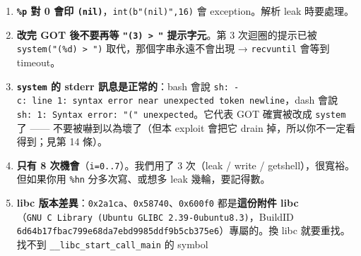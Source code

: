 \documentclass[10pt,a4paper]{article}
\begin{document}
\begin{enumerate}
  的填充、以及格式字串裡\textbf{不是格式指令}的裸文字（例如對齊用的
  \texttt{aaaaba} 貢獻 6）。所以 \texttt{\%\allowbreak{}64c\%\allowbreak{}17\$\allowbreak{}hhn} 執行到
  \texttt{\%\allowbreak{}17\$\allowbreak{}hhn} 那一刻的計數是 \textbf{64}，不是 64+7 = 75。
  想自己驗證：把位址指到一個可寫位址（或 \texttt{printf@GOT}），寫完後用
  \texttt{/\allowbreak{}proc/\allowbreak{}\textless{}\allowbreak{}pid\textgreater{}\allowbreak{}/\allowbreak{}mem} 讀回來看最低 byte
  是不是你要的值（見 §5 的自檢腳本）。 （實測：手寫
  \texttt{\%\allowbreak{}64c\%\allowbreak{}17\$\allowbreak{}hhn} 去寫一個可寫位址，結果值是 \texttt{0x40} =
  64；如果是 0x47 = 71，就代表「格式指令會計數」，但事實並非如此。）
\item
  \textbf{\texttt{\%\allowbreak{}p} 對 0 會印
  \texttt{(nil)}}，\texttt{int(b"(nil)",\allowbreak{}16)} 會 exception。解析 leak
  時要處理。
\item
  \textbf{改完 GOT 後不要再等 \texttt{"(3)\ \allowbreak{}\textgreater{}\allowbreak{}\ \allowbreak{}"}
  提示字元}。第 3 次迴圈的提示已被
  \texttt{system("(\%\allowbreak{}d)\ \allowbreak{}\textgreater{}\allowbreak{}\ \allowbreak{}")} 取代，那個字串永遠不會出現
  → \texttt{recvuntil} 會等到 timeout。
\item
  \textbf{\texttt{system} 的 stderr 訊息是正常的}：bash 會說
  \texttt{sh:\allowbreak{}\ \allowbreak{}-\allowbreak{}c:\allowbreak{}\ \allowbreak{}line\ \allowbreak{}1:\allowbreak{}\ \allowbreak{}syntax\ \allowbreak{}error\ \allowbreak{}near\ \allowbreak{}unexpected\ \allowbreak{}token\ \allowbreak{}\textquotesingle{}\allowbreak{}newline\textquotesingle{}\allowbreak{}}，dash
  會說 \texttt{sh:\allowbreak{}\ \allowbreak{}1:\allowbreak{}\ \allowbreak{}Syntax\ \allowbreak{}error:\allowbreak{}\ \allowbreak{}"("\ \allowbreak{}unexpected}。它代表 GOT
  確實被改成 \texttt{system} 了 ------ 不要被嚇到以為壞了（但本 exploit
  會把它 drain 掉，所以你不一定看得到；見第 14 條）。
\item
  \textbf{只有 8 次機會}（\texttt{i=0..\allowbreak{}7}）。我們用了 3 次（leak / write
  / getshell），很寬裕。但如果你用 \texttt{\%\allowbreak{}hn} 分多次寫、或想多 leak
  幾輪，要記得數。
\item
  \textbf{libc
  版本差異}：\texttt{0x2a1ca}、\texttt{0x58740}、\texttt{0x600f0}
  都是\textbf{這份附件
  libc}（\texttt{GNU\ \allowbreak{}C\ \allowbreak{}Library\ \allowbreak{}(Ubuntu\ \allowbreak{}GLIBC\ \allowbreak{}2.\allowbreak{}39-\allowbreak{}0ubuntu8.\allowbreak{}3)}，BuildID
  \texttt{6d64b17fbac799e68da7ebd9985ddf9b5cb375e6}）專屬的。換 libc
  就要重找。 找不到 \texttt{\_\allowbreak{}\_\allowbreak{}libc\_\allowbreak{}start\_\allowbreak{}call\_\allowbreak{}main} 的 symbol

\end{enumerate}
\end{document}
